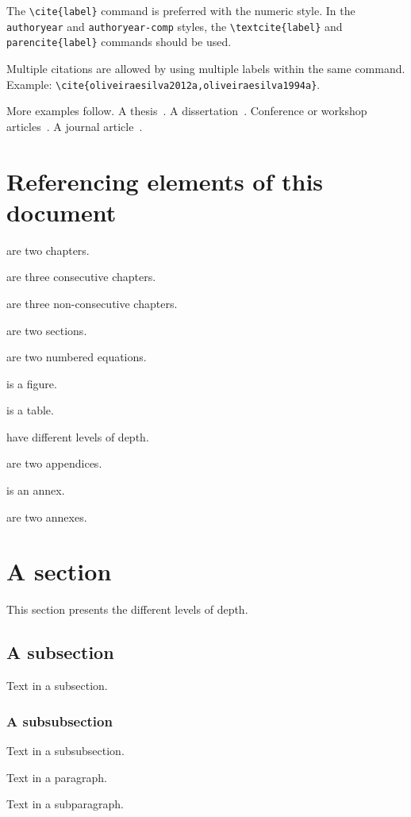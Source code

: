 The \verb+\cite{label}+ command is preferred with the numeric style.
In the \texttt{authoryear} and \texttt{authoryear-comp} styles, the \verb+\textcite{label}+ and \verb+parencite{label}+ commands should be used.

Multiple citations are allowed by using multiple labels within the same command.
Example: \verb+\cite{oliveiraesilva2012a,oliveiraesilva1994a}+.

More examples follow.
A  thesis~\parencite{oliveiraesilva1994a}.
A  dissertation~\parencite{antunes2015a}.
Conference or workshop articles~\parencite{antunes2019a,antunes2020a}.
A journal article~\parencite{antunes2019b}.


\section{Referencing elements of this document}
\label{c3:s:referencing-elements-of-this-document}

 are two chapters.

 are three consecutive chapters.

 are three non-consecutive chapters.

 are two sections.

 are two numbered equations.

 is a figure.

 is a table.

 have different levels of depth.

 are two appendices.

 is an annex.

 are two annexes.


\section{A section}
\label{c3:s:a-section}

This section presents the different levels of depth.


\subsection{A subsection}
\label{c3:ss:a-subsection}

Text in a subsection.


\subsubsection{A subsubsection}

Text in a subsubsection.



Text in a paragraph.



Text in a subparagraph.
